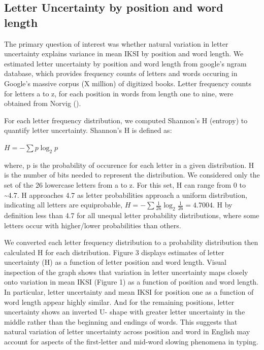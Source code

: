\documentclass[floatsintext,man]{apa6}
\theoremstyle{definition}
\theoremstyle{definition}
\theoremstyle{definition}
\theoremstyle{remark}
\begin{document}
\subsection{Letter Uncertainty by position and word
length}\label{letter-uncertainty-by-position-and-word-length}

The primary question of interest was whether natural variation in letter
uncertainty explains variance in mean IKSI by position and word length.
We estimated letter uncertainty by position and word length from
google's ngram database, which provides frequency counts of letters and
words occuring in Google's massive corpus (X million) of digitized
books. Letter frequency counts for letters a to z, for each position in
words from length one to nine, were obtained from Norvig ().

For each letter frequency distribution, we computed Shannon's H
(entropy) to quantify letter uncertainty. Shannon's H is defined as:

\(H = -\sum p \log_2 p\)

where, p is the probability of occurence for each letter in a given
distribution. H is the number of bits needed to represent the
distribution. We considered only the set of the 26 lowercase letters
from a to z. For this set, H can range from 0 to \textasciitilde{}4.7. H
approaches 4.7 as letter probabilities approach a uniform distribution,
indicating all letters are equiprobable,
\(H = -\sum \frac{1}{26} \log_2 \frac{1}{26} = 4.7004\). H by definition
less than 4.7 for all unequal letter probability distributions, where
some letters occur with higher/lower probabilities than others.

We converted each letter frequency distribution to a probability
distribution then calculated H for each distribution. Figure 3 displays
estimates of letter uncertainty (H) as a function of letter position and
word length. Visual inspection of the graph shows that variation in
letter uncertainty maps closely onto variation in mean IKSI (Figure 1)
as a function of position and word length. In particular, letter
uncertainty and mean IKSI for position one as a function of word length
appear highly similar. And for the remaining positions, letter
uncertainty shows an inverted U- shape with greater letter uncertainty
in the middle rather than the beginning and endings of words. This
suggests that natural variation of letter uncertainty across position
and word in English may account for aspects of the first-letter and
mid-word slowing phenomena in typing.
\end{document}

